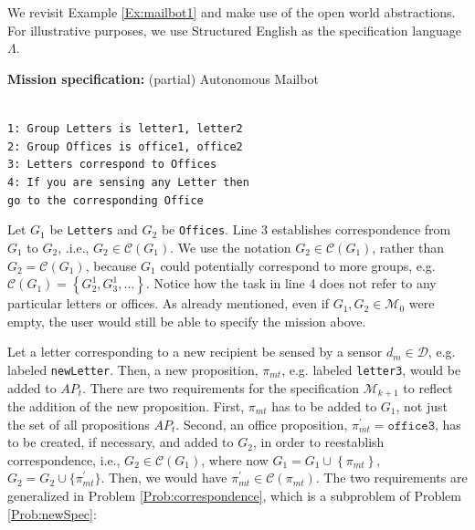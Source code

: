 \begin{myExample}\label{Ex:mailbot2}We revisit Example \ref{Ex:mailbot1} and make use of the open world abstractions. For illustrative purposes, we use Structured English \cite{JFRKGICRA12} as the specification language $\Lambda$.
\begin{algorithm}
\textbf{Mission specification:} (partial) Autonomous Mailbot
	
	\vspace{-6 pt}
	\hrulefill\\
	{\small
\texttt{1: Group Letters is letter1, letter2} \\
\texttt{2: Group Offices is office1, office2} \\
\texttt{3: Letters correspond to Offices} \\
\texttt{4: If you are sensing any Letter then}\\
\texttt{go to the corresponding Office}\\ 
}
\vspace{-10 pt}
\end{algorithm}

Let $G_1$ be \texttt{Letters} and $G_2$ be \texttt{Offices}. Line 3 establishes correspondence from $G_1$ to $G_2$, .i.e., $G_2 \in \mathcal{C}(G_1)$. We use the notation $G_2 \in \mathcal{C}(G_1)$, rather than $G_2 = \mathcal{C}(G_1)$, because $G_1$ could potentially correspond to more groups, e.g. $\mathcal{C}(G_1) = \left\{ G_2^1, G_3^1, \ldots\right\}$. 
Notice how the task in line 4 does not refer to any particular letters or offices. 
As already mentioned, even if $G_1, G_2 \in \mathcal{M}_0$ were empty, the user would still be able to specify the mission above.
\end{myExample}

Let a letter corresponding to a new recipient be sensed by a sensor $d_{m} \in \mathcal{D}$, e.g. labeled \texttt{newLetter}. Then, a new proposition, $\pi_{mt}$, e.g. labeled \texttt{letter3}, would be added to $AP_t$. 
There are two requirements for the specification $\mathcal{M}_{k+1}$ to reflect the addition of the new proposition. 
First, $\pi_{mt}$ has to be added to $G_1$, not just the set of all propositions $AP_t$. 
Second, an office proposition, $\pi_{mt}^\prime = \texttt{office3}$, has to be created, if necessary, and added to $G_2$, in order to reestablish correspondence, i.e., $G_2 \in \mathcal{C}(G_1)$, where now $G_{1} = G_1 \cup \left\{ \pi_{mt} \right\}$, $G_{2} = G_2 \cup \{ \pi_{mt}^\prime \}$. 
Then, we would have $\pi_{mt}^\prime \in \mathcal{C}(\pi_{mt})$. 
The two requirements are generalized in Problem \ref{Prob:correspondence}, which is a subproblem of Problem \ref{Prob:newSpec}:


